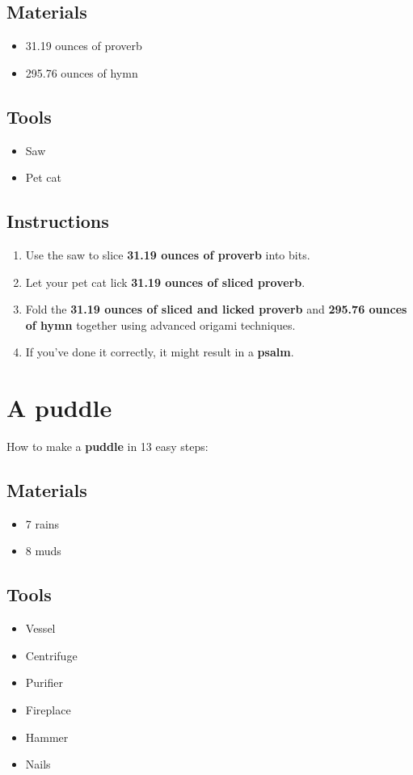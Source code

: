 \documentclass{article}
\begin{document}
\subsection{Materials}\begin{itemize}
\item 
31.19 ounces of proverb
\item 
295.76 ounces of hymn
\end{itemize}
\subsection{Tools}\begin{itemize}
\item 
Saw
\item 
Pet cat
\end{itemize}
\subsection{Instructions}\begin{enumerate}
\item 
Use the saw to slice \textbf{31.19 ounces of proverb} into bits.
\item 
Let your pet cat lick \textbf{31.19 ounces of sliced proverb}.
\item 
Fold the \textbf{31.19 ounces of sliced and licked proverb} and \textbf{295.76 ounces of hymn} together using advanced origami techniques.
\item 
If you've done it correctly, it might result in a \textbf{psalm}.
\end{enumerate}
\newpage
\section{A puddle}How to make a \textbf{puddle} in 13 easy steps:

\subsection{Materials}\begin{itemize}
\item 
7 rains
\item 
8 muds
\end{itemize}
\subsection{Tools}\begin{itemize}
\item 
Vessel
\item 
Centrifuge
\item 
Purifier
\item 
Fireplace
\item 
Hammer
\item 
Nails
\end{itemize}
\end{document}
